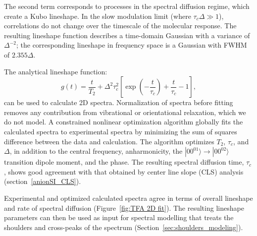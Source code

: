 \documentclass[%
  class = book,%
  crop = false,%
  float = true,%
  multi = true,%
  preview = false,%
]{standalone}
\begin{document}
{The second term corresponds to processes in the spectral diffusion regime, which create a Kubo lineshape. In the slow modulation limit (where \(\tau_c \Delta \gg 1\)), correlations do not change over the timescale of the molecular response. The resulting lineshape function describes a time-domain Gaussian with a variance of \(\Delta^{-2}\); the corresponding lineshape in frequency space is a Gaussian with FWHM of \(2.355\Delta\).

The analytical lineshape function:
\begin{equation}
  \label{eq:g(t)}
  g(t) = \frac{t}{T_2} + \Delta^2\tau_c^2 \left[ \exp{\left( -\frac{t}{\tau_c} \right)}
	+ \frac{t}{\tau_c} - 1 \right],
\end{equation}
can be used to calculate 2D spectra. Normalization of spectra before fitting removes any contribution from vibrational or orientational relaxation, which we do not model. A constrained nonlinear optimization algorithm globally fits the calculated spectra to experimental spectra by minimizing the sum of squares difference between the data and calculation. The algorithm optimizes \(T_2\), \(\tau_c\), and \(\Delta\), in addition to the central frequency, anharmonicity, the $|00^01{\rangle} \rightarrow |00^02{\rangle}$ transition dipole moment, and the phase. The resulting spectral diffusion time, \(\tau_c\), shows good agreement with that obtained by center line slope (CLS) analysis (section~\ref{anionSI_CLS}).

Experimental and optimized calculated spectra agree in terms of overall lineshape and rate of spectral diffusion (Figure~\ref{fig:TFA 2D fit}). The resulting lineshape parameters can then be used as input for spectral modelling that treats the shoulders and cross-peaks of the spectrum (Section~\ref{sec:shoulders_modeling}).

}
\end{document}
